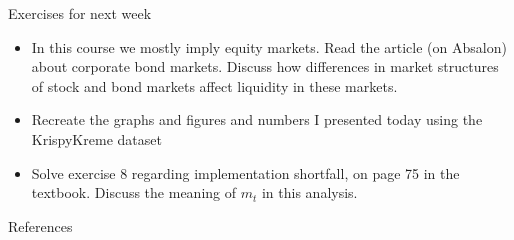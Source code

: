 \documentclass[english,10pt
,aspectratio=169
]{beamer}
\begin{document}
\begin{frame}{Exercises for next week}
	\begin{itemize}
		\item In this course we mostly imply equity markets. Read the article (on Absalon) about corporate bond markets. Discuss how differences in market structures of stock and bond markets affect liquidity in these markets.
		\item Recreate the graphs and figures and numbers I presented today using the KrispyKreme dataset
		\item Solve exercise 8 regarding implementation shortfall, on page 75 in the textbook.
		Discuss the meaning of $m_t$ in this analysis.
	\end{itemize}
\end{frame}




\appendix
\begin{frame}[allowframebreaks]{References}
	
	
\end{frame}
\end{document}

